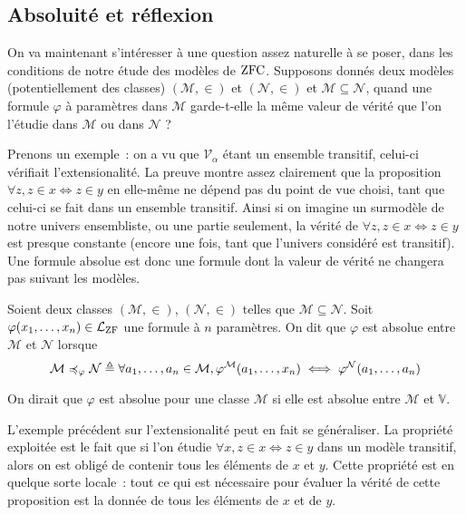 \subsection{Absoluité et réflexion}

On va maintenant s'intéresser à une question assez naturelle à se poser, dans
les conditions de notre étude des modèles de $\operatorname{ZFC}$. Supposons donnés deux
modèles (potentiellement des classes) $(\mathcal M,\in)$ et $(\mathcal N,\in)$
et $\mathcal M \subseteq \mathcal N$, quand une formule $\varphi$ à paramètres
dans $\mathcal M$ garde-t-elle la même valeur de vérité que l'on l'étudie dans
$\mathcal M$ ou dans $\mathcal N$ ?

Prenons un exemple~: on a vu que $\mathcal V_\alpha$ étant un ensemble
transitif, celui-ci vérifiait l'extensionalité. La preuve montre assez
clairement que la proposition $\forall z, z \in x \iff z \in y$ en elle-même
ne dépend pas du point de vue choisi, tant que celui-ci se fait dans un
ensemble transitif. Ainsi si on imagine un surmodèle de notre univers
ensembliste, ou une partie seulement, la vérité de
$\forall z, z \in x \iff z \in y$ est presque constante (encore une fois, tant
que l'univers considéré est transitif). Une formule absolue est donc une
formule dont la valeur de vérité ne changera pas suivant les modèles.

\begin{definition}
  Soient deux classes $(\mathcal M,\in)$, $(\mathcal N,\in)$ telles que
  $\mathcal M \subseteq \mathcal N$.
  Soit $\varphi(x_1,\ldots,x_n) \in \mathcal L_{\operatorname{ZF}}$ une formule à $n$
  paramètres. On dit que $\varphi$ est absolue entre $\mathcal M$ et
  $\mathcal N$ lorsque
  \[\mathcal M \preccurlyeq_\varphi \mathcal N \triangleq
  \forall a_1,\ldots,a_n \in \mathcal M, \varphi^{\mathcal M}(a_1,\ldots,x_n)
  \iff \varphi^{\mathcal N}(a_1,\ldots,a_n)\]

  On dirait que $\varphi$ est absolue pour une classe $\mathcal M$ si elle est
  absolue entre $\mathcal M$ et $\mathbb V$.
\end{definition}

L'exemple précédent sur l'extensionalité peut en fait se généraliser. La
propriété exploitée est le fait que si l'on étudie
$\forall x, z \in x \iff z \in y$ dans un modèle transitif, alors on est obligé
de contenir tous les éléments de $x$ et $y$. Cette propriété est en quelque
sorte locale~: tout ce qui est nécessaire pour évaluer la vérité de cette
proposition est la donnée de tous les éléments de $x$ et de $y$.

